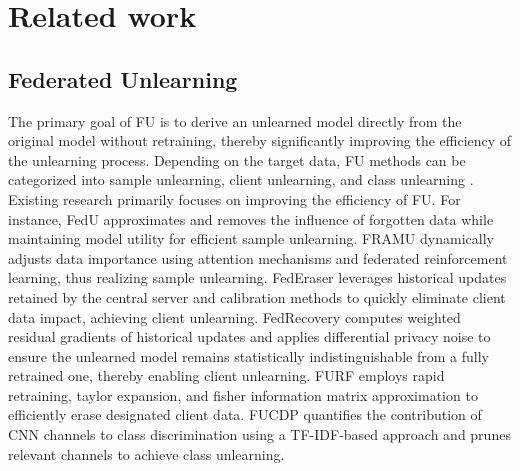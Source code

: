\section{Related work}
\label{relatedwork}
\subsection{Federated Unlearning}
The primary goal of FU is to derive an unlearned model directly from the original model without retraining, thereby significantly improving the efficiency of the unlearning process. Depending on the target data, FU methods can be categorized into sample unlearning, client unlearning, and class unlearning \cite{liu2024survey}. 
Existing research primarily focuses on improving the efficiency of FU. For instance, FedU \cite{wang2024fedu} approximates and removes the influence of forgotten data while maintaining model utility for efficient sample unlearning. FRAMU \cite{shaik2024framu} dynamically adjusts data importance using attention mechanisms and federated reinforcement learning, thus realizing sample unlearning. FedEraser \cite{liu2021federaser} leverages historical updates retained by the central server and calibration methods to quickly eliminate client data impact, achieving client unlearning. FedRecovery \cite{zhang2023fedrecovery} computes weighted residual gradients of historical updates and applies differential privacy noise to ensure the unlearned model remains statistically indistinguishable from a fully retrained one, thereby enabling client unlearning. FURF \cite{liu2022right} employs rapid retraining, taylor expansion, and fisher information matrix approximation to efficiently erase designated client data. FUCDP \cite{wang2022federated} quantifies the contribution of CNN channels to class discrimination using a TF-IDF-based approach and prunes relevant channels to achieve class unlearning.  

